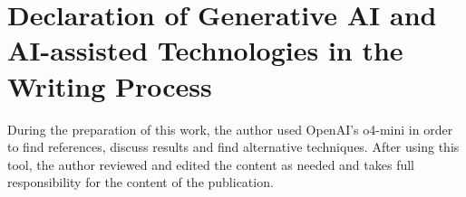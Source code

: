 \chapter*{Declaration of Generative AI and AI-assisted Technologies in the 
Writing Process}

During the preparation of this work, the author used OpenAI's o4-mini in order to find references, discuss results and find alternative techniques. 
After using this tool, the author reviewed and edited the content as needed and takes full 
responsibility for the content of the publication.